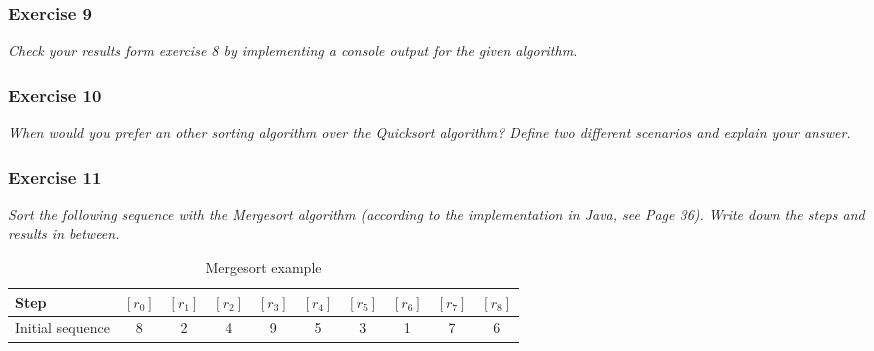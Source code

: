 \subsubsection*{Exercise 9}
\textit{Check your results form exercise 8 by implementing a console 
	output for the given algorithm.} \\

\subsubsection*{Exercise 10}
\textit{When would you prefer an other sorting algorithm over the 
	Quicksort algorithm? Define two different scenarios and 
	explain your answer.} \\

\subsubsection*{Exercise 11}
\textit{Sort the following sequence with the Mergesort algorithm 
	(according to the implementation in Java, see Page 36).
	Write down the steps and results in between.} \\

\begin{table}[h!]
	\centering
	\begin{tabular}{l c  c  c  c  c  c  c  c  c }
		Step & $[r_0]$ &$[r_1]$ &$[r_2]$ &$[r_3]$ &$[r_4]$ 
			&$[r_5]$ &$[r_6]$ &$[r_7]$ &$[r_8]$ \\ 
		\hline
		Initial sequence & 8 & 2 & 4 & 9 & 5 & 3 & 1 & 7 & 6 \\
		\hline
	\end{tabular}
	\caption{Mergesort example}
\end{table}
